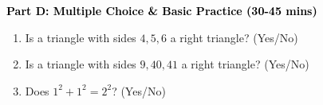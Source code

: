 \documentclass[12pt, letterpaper, fleqn]{article}
\newcommand{\blank}{\underline{\hspace{2.2cm}}}
\begin{document}
\newpage

\begin{tcolorbox}[colback=customteal!20]
\large\textcolor{black}{\textbf{Part D: Multiple Choice \& Basic Practice (30-45 mins)}}
\end{tcolorbox}

\vspace{3mm}

\begin{enumerate}[itemsep=2.5cm, leftmargin=0.6cm, resume]
\item Is a triangle with sides $4, 5, 6$ a right triangle? (Yes/No) \blank
\item Is a triangle with sides $9, 40, 41$ a right triangle? (Yes/No) \blank
\item Does $1^2 + 1^2 = 2^2$? (Yes/No) \blank
\end{enumerate}
\end{document}
